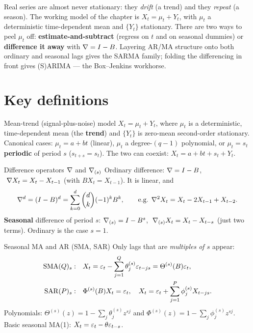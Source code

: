 \documentclass[11pt]{article}
\begin{document}

Real series are almost never stationary: they \emph{drift} (a trend) and they \emph{repeat} (a season). The working model of the chapter is $X_t=\mu_t+Y_t$, with $\mu_t$ a deterministic time-dependent mean and $\{Y_t\}$ stationary. There are two ways to peel $\mu_t$ off: \textbf{estimate-and-subtract} (regress on $t$ and on seasonal dummies) or \textbf{difference it away} with $\nabla=I-B$. Layering AR/MA structure onto both ordinary and seasonal lags gives the SARMA family; folding the differencing in front gives (S)ARIMA --- the Box--Jenkins workhorse.

\section*{Key definitions}

\begin{defn}{Mean-trend (signal-plus-noise) model}
$X_t=\mu_t+Y_t$, where $\mu_t$ is a deterministic, time-dependent mean (the \textbf{trend}) and $\{Y_t\}$ is zero-mean second-order stationary. Canonical cases: $\mu_t=a+bt$ (linear), $\mu_t$ a degree-$(q-1)$ polynomial, or $\mu_t=s_t$ \textbf{periodic} of period $s$ ($s_{t+s}=s_t$). The two can coexist: $X_t=a+bt+s_t+Y_t$.
\end{defn}

\begin{defn}{Difference operators $\nabla$ and $\nabla_{(s)}$}
Ordinary difference: $\nabla=I-B$, $\ \nabla X_t=X_t-X_{t-1}$ (with $BX_t=X_{t-1}$). It is linear, and
\[
\nabla^{d}=(I-B)^{d}=\sum_{k=0}^{d}\binom{d}{k}(-1)^{k}B^{k},\qquad
\text{e.g. } \nabla^{2}X_t=X_t-2X_{t-1}+X_{t-2}.
\]
\textbf{Seasonal} difference of period $s$: $\nabla_{(s)}=I-B^{s}$, $\ \nabla_{(s)}X_t=X_t-X_{t-s}$ (just two terms). Ordinary is the case $s=1$.
\end{defn}

\begin{defn}{Seasonal MA and AR (SMA, SAR)}
Only lags that are \emph{multiples of $s$} appear:
\[
\begin{aligned}
\mathrm{SMA}(Q)_s:&\quad X_t=\varepsilon_t-\sum_{j=1}^{Q}\theta^{(s)}_j\varepsilon_{t-js}=\Theta^{(s)}(B)\varepsilon_t,\\
\mathrm{SAR}(P)_s:&\quad \Phi^{(s)}(B)X_t=\varepsilon_t,\quad X_t=\varepsilon_t+\sum_{j=1}^{P}\phi^{(s)}_jX_{t-js}.
\end{aligned}
\]
Polynomials: $\Theta^{(s)}(z)=1-\sum_j\theta^{(s)}_jz^{sj}$ and $\Phi^{(s)}(z)=1-\sum_j\phi^{(s)}_jz^{sj}$. Basic seasonal MA(1): $X_t=\varepsilon_t-\theta\varepsilon_{t-s}$.
\end{defn}
\end{document}
